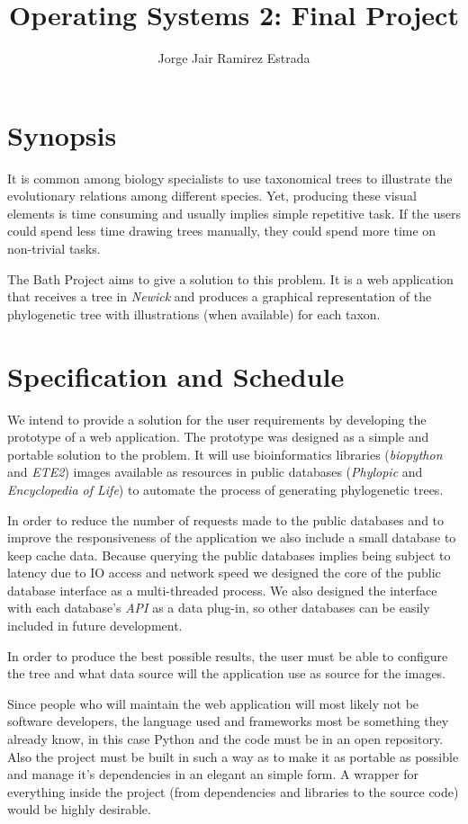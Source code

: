 \documentclass[10pt]{article}
\author{Jorge Jair Ramirez Estrada}
\title{Operating Systems 2: Final Project}
\begin{document}
\maketitle

\section{Synopsis}
It is common among biology specialists to use taxonomical trees to illustrate the evolutionary relations among different species. Yet, producing these visual elements is time consuming and usually implies simple repetitive task. If the users could spend less time drawing trees manually, they could spend more time on non-trivial tasks.

The Bath Project aims to give a solution to this problem. It is a web application that receives a tree in \textit{Newick} and produces a graphical representation of the phylogenetic tree with illustrations (when available) for each taxon.

\section{Specification and Schedule}
We intend to provide a solution for the user requirements by developing the prototype of a web application. The prototype was designed as a simple and portable solution to the problem. It will use bioinformatics libraries (\textit{biopython} and \textit{ETE2}) images available as resources in public databases (\textit{Phylopic} and \textit{Encyclopedia of Life}) to automate the process of generating phylogenetic trees.

In order to reduce the number of requests made to the public databases and to improve the responsiveness of the application we also include a small database to keep cache data. Because querying the public databases implies being subject to latency due to IO access and network speed we designed the core of the public database interface as a multi-threaded process. We also designed the interface with each database's \textit{API} as a data plug-in, so other databases can be easily included in future development.

In order to produce the best possible results, the user must be able to configure the tree and what data source will the application use as source for the images. %

Since people who will maintain the web application will most likely not be software developers, the language used and frameworks most be something they already know, in this case Python and the code must be in an open repository. Also the project must be built in such a way as to make it as portable as possible and manage it's dependencies in an elegant an simple form. A wrapper for everything inside the project (from dependencies and libraries to the source code) would be highly desirable. %
\end{document}

